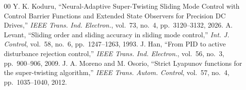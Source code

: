 \documentclass[journal,twocolumn,letterpaper]{IEEEtran}
\begin{document}
\begin{thebibliography}{00}
 Y. K. Koduru, ``Neural-Adaptive Super-Twisting Sliding Mode Control with Control Barrier Functions and Extended State Observers for Precision DC Drives,'' \emph{IEEE Trans. Ind. Electron.}, vol.~73, no.~4, pp.~3120--3132, 2026.
 A. Levant, ``Sliding order and sliding accuracy in sliding mode control,'' \emph{Int. J. Control}, vol.~58, no.~6, pp.~1247--1263, 1993.
 J. Han, ``From PID to active disturbance rejection control,'' \emph{IEEE Trans. Ind. Electron.}, vol.~56, no.~3, pp.~900--906, 2009.
 J. A. Moreno and M. Osorio, ``Strict Lyapunov functions for the super-twisting algorithm,'' \emph{IEEE Trans. Autom. Control}, vol.~57, no.~4, pp.~1035--1040, 2012.
\end{thebibliography}
\end{document}
